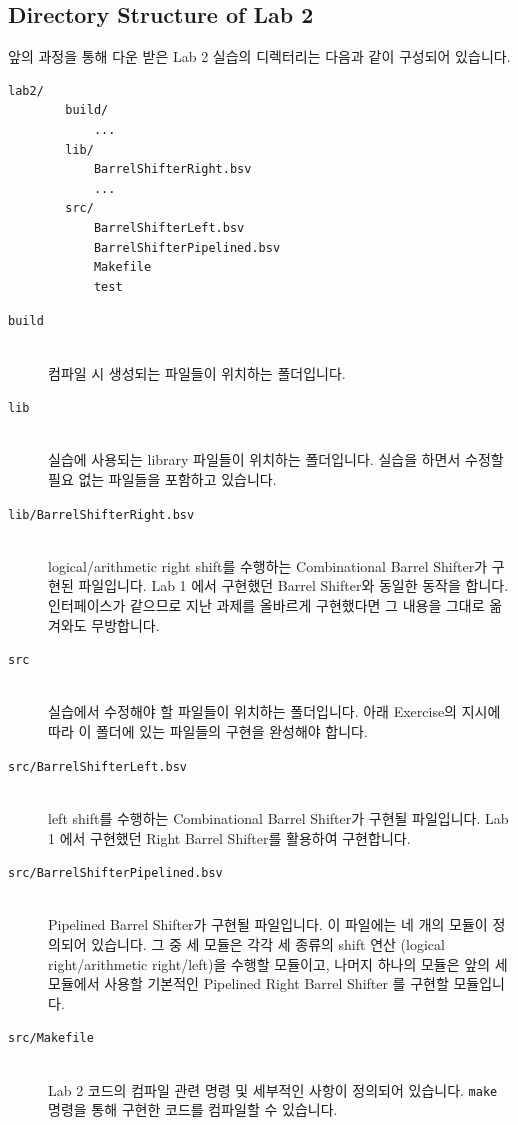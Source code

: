 \documentclass{article}
\begin{document}
\subsection{Directory Structure of Lab 2}
앞의 과정을 통해 다운 받은 Lab 2 실습의 디렉터리는 다음과 같이 구성되어 있습니다.
\begin{Verbatim}[frame=single]
    lab2/	
        build/
            ...
        lib/
            BarrelShifterRight.bsv
            ...
        src/
            BarrelShifterLeft.bsv
            BarrelShifterPipelined.bsv
            Makefile
            test
\end{Verbatim}

\begin{description}
\item [\texttt{build}]\hfill \ \\
컴파일 시 생성되는 파일들이 위치하는 폴더입니다.

\item [\texttt{lib}]\hfill \ \\
	실습에 사용되는 library 파일들이 위치하는 폴더입니다.
	실습을 하면서 수정할 필요 없는 파일들을 포함하고 있습니다.

\item [\texttt{lib/BarrelShifterRight.bsv}]\hfill \ \\
	logical/arithmetic right shift를 수행하는 Combinational Barrel Shifter가 구현된 파일입니다.
	Lab 1 에서 구현했던 Barrel Shifter와 동일한 동작을 합니다. 인터페이스가 같으므로 
	지난 과제를 올바르게 구현했다면 그 내용을 그대로 옮겨와도 무방합니다.

\item [\texttt{src}]\hfill \ \\ 
	실습에서 수정해야 할 파일들이 위치하는 폴더입니다.
	아래 Exercise의 지시에 따라 이 폴더에 있는 파일들의 구현을 완성해야 합니다.

\item [\texttt{src/BarrelShifterLeft.bsv}]\hfill \ \\
	left shift를 수행하는 Combinational Barrel Shifter가 구현될 파일입니다. 
	Lab 1 에서 구현했던 Right Barrel Shifter를 활용하여 구현합니다. 

\item [\texttt{src/BarrelShifterPipelined.bsv}]\hfill \ \\
	Pipelined Barrel Shifter가 구현될 파일입니다. 이 파일에는 네 개의 모듈이 정의되어 있습니다.
	그 중 세 모듈은 각각 세 종류의 shift 연산 (logical right/arithmetic right/left)을 수행할 모듈이고, 
	나머지 하나의 모듈은 앞의 세 모듈에서 사용할 기본적인 Pipelined Right Barrel Shifter 를 구현할 모듈입니다.
\item [\texttt{src/Makefile}]\hfill \ \\
	Lab 2 코드의 컴파일 관련 명령 및 세부적인 사항이 정의되어 있습니다.
	\texttt{make} 명령을 통해 구현한 코드를 컴파일할 수 있습니다.


\end{description}
\end{document}
